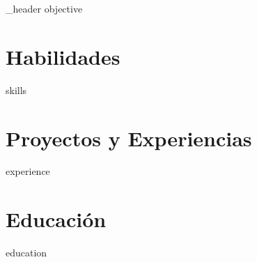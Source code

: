 \documentclass[letter,10pt]{article}
\author{Facundo Bacigalupi} %
\begin{document}
{_header}
{objective}

\section{Habilidades}
{skills}

\section{Proyectos y Experiencias}
{experience}

\section{Educación}
{education}

\end{document}
